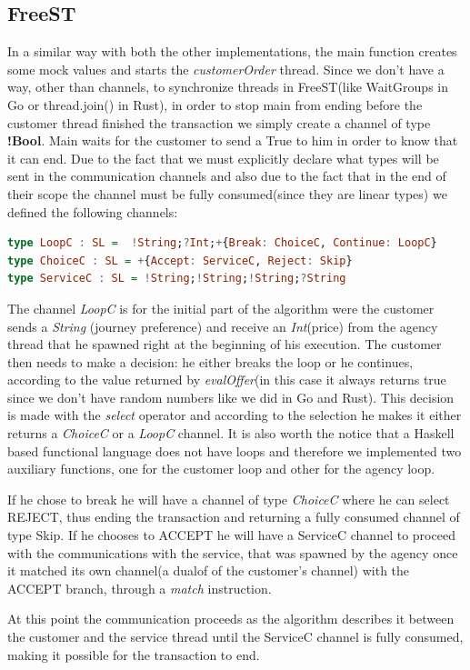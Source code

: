\documentclass[runningheads]{llncs}
\begin{document}
\subsection{FreeST}
In a similar way with both the other implementations, the main function creates some mock values and starts the {\it customerOrder} thread. Since we don't have a way, other than channels, to synchronize threads in FreeST(like WaitGroups in Go or thread.join() in Rust), in order to stop main from ending before the customer thread finished the transaction we simply create a channel of type {\bf !Bool}. Main waits for the customer to send a True to him in order to know that it can end.
Due to the fact that we must explicitly declare what types will be sent in the communication channels and also due to the fact that in the end of their scope the channel must be fully consumed(since they are linear types) we defined the following channels:
\begin{lstlisting}[language=haskell]
type LoopC : SL =  !String;?Int;+{Break: ChoiceC, Continue: LoopC}
type ChoiceC : SL = +{Accept: ServiceC, Reject: Skip}
type ServiceC : SL = !String;!String;!String;?String
\end{lstlisting}
The channel {\it LoopC} is for the initial part of the algorithm were the customer sends a {\it String} (journey preference) and receive an {\it Int}(price) from the agency thread that he spawned right at the beginning of his execution. The customer then needs to make a decision: he either breaks the loop or he continues, according to the value returned by {\it evalOffer}(in this case it always returns true since we don't have random numbers like we did in Go and Rust). This decision is made with the {\it select} operator and according to the selection he makes it either returns a {\it ChoiceC} or a {\it LoopC} channel. It is also worth the notice that a Haskell based functional language does not have loops and therefore we implemented two auxiliary functions, one for the customer loop and other for the agency loop.

If he chose to break he will have a channel of type {\it ChoiceC} where he can select REJECT, thus ending the transaction and returning a fully consumed channel of type Skip. If he chooses to ACCEPT he will have a ServiceC channel to proceed with the communications with the service, that was spawned by the agency once it matched its own channel(a dualof of the customer's channel) with the ACCEPT branch, through a {\it match} instruction.

At this point the communication proceeds as the algorithm describes it between the customer and the service thread until the ServiceC channel is fully consumed, making it possible for the transaction to end.
\end{document}
